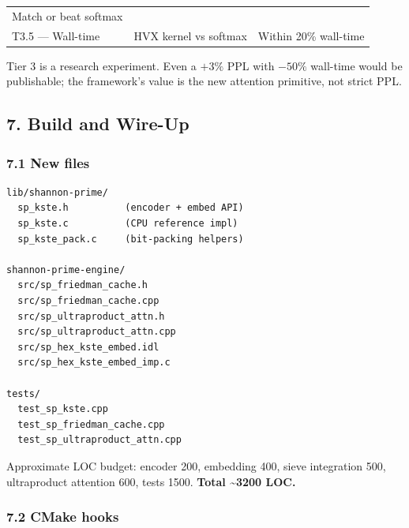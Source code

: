 \documentclass[
  11pt,
]{article}
\begin{document}
\begin{longtable}[]{@{}lll@{}}
\begin{minipage}[t]{0.49\columnwidth}
Match or beat softmax\strut
\end{minipage}\tabularnewline
\begin{minipage}[t]{0.18\columnwidth}\raggedright
T3.5 --- Wall-time\strut
\end{minipage} & \begin{minipage}[t]{0.24\columnwidth}\raggedright
HVX kernel vs softmax\strut
\end{minipage} & \begin{minipage}[t]{0.49\columnwidth}\raggedright
Within 20\% wall-time\strut
\end{minipage}\tabularnewline
\bottomrule
\end{longtable}

Tier 3 is a research experiment. Even a \(+3\%\) PPL with \(-50\%\)
wall-time would be publishable; the framework's value is the new
attention primitive, not strict PPL.

\hypertarget{build-and-wire-up}{%
\subsection{7. Build and Wire-Up}\label{build-and-wire-up}}

\hypertarget{new-files}{%
\subsubsection{7.1 New files}\label{new-files}}

\begin{verbatim}
lib/shannon-prime/
  sp_kste.h          (encoder + embed API)
  sp_kste.c          (CPU reference impl)
  sp_kste_pack.c     (bit-packing helpers)

shannon-prime-engine/
  src/sp_friedman_cache.h
  src/sp_friedman_cache.cpp
  src/sp_ultraproduct_attn.h
  src/sp_ultraproduct_attn.cpp
  src/sp_hex_kste_embed.idl
  src/sp_hex_kste_embed_imp.c

tests/
  test_sp_kste.cpp
  test_sp_friedman_cache.cpp
  test_sp_ultraproduct_attn.cpp
\end{verbatim}

Approximate LOC budget: encoder 200, embedding 400, sieve integration
500, ultraproduct attention 600, tests 1500. \textbf{Total
\textasciitilde3200 LOC.}

\hypertarget{cmake-hooks}{%
\subsubsection{7.2 CMake hooks}\label{cmake-hooks}}
\end{document}
